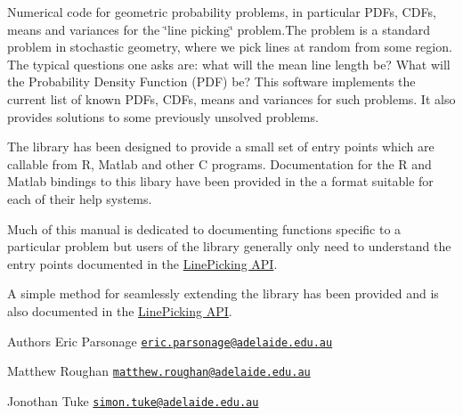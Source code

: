Numerical code for geometric probability problems, in particular P\-D\-Fs, C\-D\-Fs, means and variances for the \char`\"{}line picking\char`\"{} problem.\-The problem is a standard problem in stochastic geometry, where we pick lines at random from some region. The typical questions one asks are\-: what will the mean line length be? What will the Probability Density Function (P\-D\-F) be? This software implements the current list of known P\-D\-Fs, C\-D\-Fs, means and variances for such problems. It also provides solutions to some previously unsolved problems.

The library has been designed to provide a small set of entry points which are callable from R, Matlab and other C programs. Documentation for the R and Matlab bindings to this libary have been provided in the a format suitable for each of their help systems.

Much of this manual is dedicated to documenting functions specific to a particular problem but users of the library generally only need to understand the entry points documented in the \hyperlink{group__api}{Line\-Picking A\-P\-I}.

A simple method for seamlessly extending the library has been provided and is also documented in the \hyperlink{group__api}{Line\-Picking A\-P\-I}.

\begin{DoxyAuthor}{Authors}
Eric Parsonage \href{mailto:eric.parsonage@adelaide.edu.au}{\tt eric.\-parsonage@adelaide.\-edu.\-au} 

Matthew Roughan \href{mailto:matthew.roughan@adelaide.edu.au}{\tt matthew.\-roughan@adelaide.\-edu.\-au} 

Jonothan Tuke \href{mailto:simon.tuke@adelaide.edu.au}{\tt simon.\-tuke@adelaide.\-edu.\-au} 
\end{DoxyAuthor}
